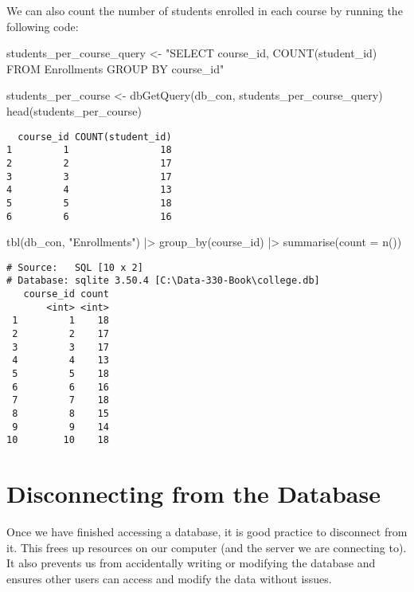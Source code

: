 \documentclass[
  letterpaper,
  DIV=11,
  numbers=noendperiod]{scrreprt}
\newenvironment{Shaded}{\begin{snugshade}}{\end{snugshade}}
\newcommand{\AttributeTok}[1]{\textcolor[rgb]{0.40,0.45,0.13}{#1}}
\newcommand{\FunctionTok}[1]{\textcolor[rgb]{0.28,0.35,0.67}{#1}}
\newcommand{\NormalTok}[1]{\textcolor[rgb]{0.00,0.23,0.31}{#1}}
\newcommand{\OtherTok}[1]{\textcolor[rgb]{0.00,0.23,0.31}{#1}}
\newcommand{\SpecialCharTok}[1]{\textcolor[rgb]{0.37,0.37,0.37}{#1}}
\newcommand{\StringTok}[1]{\textcolor[rgb]{0.13,0.47,0.30}{#1}}
\begin{document}
We can also count the number of students enrolled in each course by
running the following code:

\begin{Shaded}
\begin{Highlighting}[]
\NormalTok{students\_per\_course\_query }\OtherTok{\textless{}{-}}   \StringTok{"SELECT course\_id, COUNT(student\_id)}
\StringTok{                               FROM Enrollments}
\StringTok{                               GROUP BY course\_id"}

\NormalTok{students\_per\_course }\OtherTok{\textless{}{-}} \FunctionTok{dbGetQuery}\NormalTok{(db\_con, students\_per\_course\_query)}
\FunctionTok{head}\NormalTok{(students\_per\_course)}
\end{Highlighting}
\end{Shaded}

\begin{verbatim}
  course_id COUNT(student_id)
1         1                18
2         2                17
3         3                17
4         4                13
5         5                18
6         6                16
\end{verbatim}

\begin{Shaded}
\begin{Highlighting}[]
\FunctionTok{tbl}\NormalTok{(db\_con, }\StringTok{"Enrollments"}\NormalTok{) }\SpecialCharTok{|\textgreater{}} 
  \FunctionTok{group\_by}\NormalTok{(course\_id) }\SpecialCharTok{|\textgreater{}}
  \FunctionTok{summarise}\NormalTok{(}\AttributeTok{count =} \FunctionTok{n}\NormalTok{())}
\end{Highlighting}
\end{Shaded}

\begin{verbatim}
# Source:   SQL [10 x 2]
# Database: sqlite 3.50.4 [C:\Data-330-Book\college.db]
   course_id count
       <int> <int>
 1         1    18
 2         2    17
 3         3    17
 4         4    13
 5         5    18
 6         6    16
 7         7    18
 8         8    15
 9         9    14
10        10    18
\end{verbatim}

\section{Disconnecting from the
Database}\label{disconnecting-from-the-database}

Once we have finished accessing a database, it is good practice to
disconnect from it. This frees up resources on our computer (and the
server we are connecting to). It also prevents us from accidentally
writing or modifying the database and ensures other users can access and
modify the data without issues.
\end{document}

